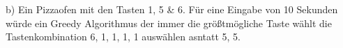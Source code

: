 \documentclass[a4paper]{scrartcl}
\begin{document}
b)
Ein Pizzaofen mit den Tasten 1, 5 \& 6. Für eine Eingabe von 10 Sekunden würde ein Greedy Algorithmus der immer die größtmögliche
Taste wählt die Tastenkombination 6, 1, 1, 1, 1  auswählen asntatt 5, 5.



\end{document}
